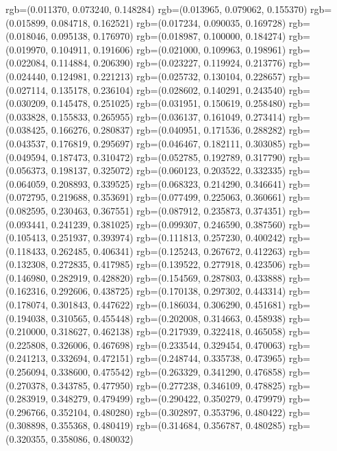{{{					rgb=(0.011370, 0.073240, 0.148284)
					rgb=(0.013965, 0.079062, 0.155370)
					rgb=(0.015899, 0.084718, 0.162521)
					rgb=(0.017234, 0.090035, 0.169728)
					rgb=(0.018046, 0.095138, 0.176970)
					rgb=(0.018987, 0.100000, 0.184274)
					rgb=(0.019970, 0.104911, 0.191606)
					rgb=(0.021000, 0.109963, 0.198961)
					rgb=(0.022084, 0.114884, 0.206390)
					rgb=(0.023227, 0.119924, 0.213776)
					rgb=(0.024440, 0.124981, 0.221213)
					rgb=(0.025732, 0.130104, 0.228657)
					rgb=(0.027114, 0.135178, 0.236104)
					rgb=(0.028602, 0.140291, 0.243540)
					rgb=(0.030209, 0.145478, 0.251025)
					rgb=(0.031951, 0.150619, 0.258480)
					rgb=(0.033828, 0.155833, 0.265955)
					rgb=(0.036137, 0.161049, 0.273414)
					rgb=(0.038425, 0.166276, 0.280837)
					rgb=(0.040951, 0.171536, 0.288282)
					rgb=(0.043537, 0.176819, 0.295697)
					rgb=(0.046467, 0.182111, 0.303085)
					rgb=(0.049594, 0.187473, 0.310472)
					rgb=(0.052785, 0.192789, 0.317790)
					rgb=(0.056373, 0.198137, 0.325072)
					rgb=(0.060123, 0.203522, 0.332335)
					rgb=(0.064059, 0.208893, 0.339525)
					rgb=(0.068323, 0.214290, 0.346641)
					rgb=(0.072795, 0.219688, 0.353691)
					rgb=(0.077499, 0.225063, 0.360661)
					rgb=(0.082595, 0.230463, 0.367551)
					rgb=(0.087912, 0.235873, 0.374351)
					rgb=(0.093441, 0.241239, 0.381025)
					rgb=(0.099307, 0.246590, 0.387560)
					rgb=(0.105413, 0.251937, 0.393974)
					rgb=(0.111813, 0.257230, 0.400242)
					rgb=(0.118433, 0.262485, 0.406341)
					rgb=(0.125243, 0.267672, 0.412263)
					rgb=(0.132308, 0.272835, 0.417985)
					rgb=(0.139522, 0.277918, 0.423506)
					rgb=(0.146980, 0.282919, 0.428820)
					rgb=(0.154569, 0.287803, 0.433888)
					rgb=(0.162316, 0.292606, 0.438725)
					rgb=(0.170138, 0.297302, 0.443314)
					rgb=(0.178074, 0.301843, 0.447622)
					rgb=(0.186034, 0.306290, 0.451681)
					rgb=(0.194038, 0.310565, 0.455448)
					rgb=(0.202008, 0.314663, 0.458938)
					rgb=(0.210000, 0.318627, 0.462138)
					rgb=(0.217939, 0.322418, 0.465058)
					rgb=(0.225808, 0.326006, 0.467698)
					rgb=(0.233544, 0.329454, 0.470063)
					rgb=(0.241213, 0.332694, 0.472151)
					rgb=(0.248744, 0.335738, 0.473965)
					rgb=(0.256094, 0.338600, 0.475542)
					rgb=(0.263329, 0.341290, 0.476858)
					rgb=(0.270378, 0.343785, 0.477950)
					rgb=(0.277238, 0.346109, 0.478825)
					rgb=(0.283919, 0.348279, 0.479499)
					rgb=(0.290422, 0.350279, 0.479979)
					rgb=(0.296766, 0.352104, 0.480280)
					rgb=(0.302897, 0.353796, 0.480422)
					rgb=(0.308898, 0.355368, 0.480419)
					rgb=(0.314684, 0.356787, 0.480285)
					rgb=(0.320355, 0.358086, 0.480032)
}}}
